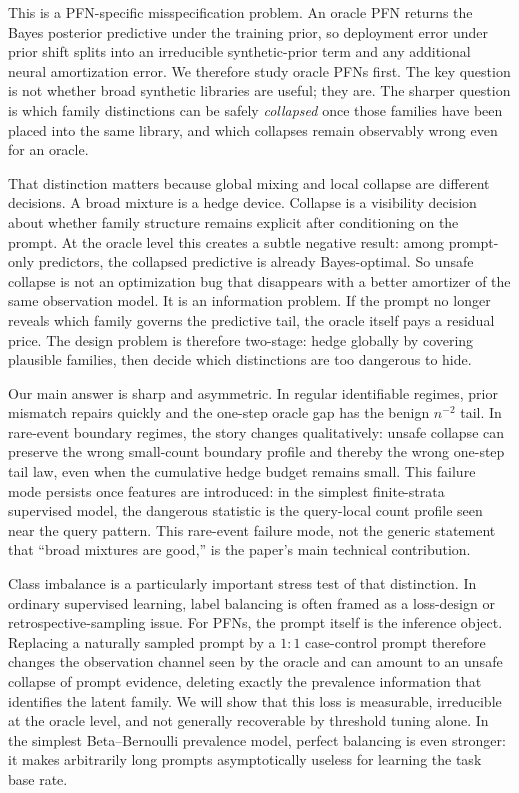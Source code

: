 \documentclass{article}
\theoremstyle{definition}
\theoremstyle{remark}
\begin{document}
This is a PFN-specific misspecification problem. An oracle PFN returns the Bayes posterior predictive under the training prior, so deployment error under prior shift splits into an irreducible synthetic-prior term and any additional neural amortization error. We therefore study oracle PFNs first. The key question is not whether broad synthetic libraries are useful; they are. The sharper question is which family distinctions can be safely \emph{collapsed} once those families have been placed into the same library, and which collapses remain observably wrong even for an oracle.

That distinction matters because global mixing and local collapse are different decisions. A broad mixture is a hedge device. Collapse is a visibility decision about whether family structure remains explicit after conditioning on the prompt. At the oracle level this creates a subtle negative result: among prompt-only predictors, the collapsed predictive is already Bayes-optimal. So unsafe collapse is not an optimization bug that disappears with a better amortizer of the same observation model. It is an information problem. If the prompt no longer reveals which family governs the predictive tail, the oracle itself pays a residual price. The design problem is therefore two-stage: hedge globally by covering plausible families, then decide which distinctions are too dangerous to hide.

Our main answer is sharp and asymmetric. In regular identifiable regimes, prior mismatch repairs quickly and the one-step oracle gap has the benign $n^{-2}$ tail. In rare-event boundary regimes, the story changes qualitatively: unsafe collapse can preserve the wrong small-count boundary profile and thereby the wrong one-step tail law, even when the cumulative hedge budget remains small. This failure mode persists once features are introduced: in the simplest finite-strata supervised model, the dangerous statistic is the query-local count profile seen near the query pattern. This rare-event failure mode, not the generic statement that ``broad mixtures are good,'' is the paper's main technical contribution.

Class imbalance is a particularly important stress test of that distinction. In ordinary supervised learning, label balancing is often framed as a loss-design or retrospective-sampling issue. For PFNs, the prompt itself is the inference object. Replacing a naturally sampled prompt by a $1{:}1$ case-control prompt therefore changes the observation channel seen by the oracle and can amount to an unsafe collapse of prompt evidence, deleting exactly the prevalence information that identifies the latent family. We will show that this loss is measurable, irreducible at the oracle level, and not generally recoverable by threshold tuning alone. In the simplest Beta--Bernoulli prevalence model, perfect balancing is even stronger: it makes arbitrarily long prompts asymptotically useless for learning the task base rate.
\end{document}
